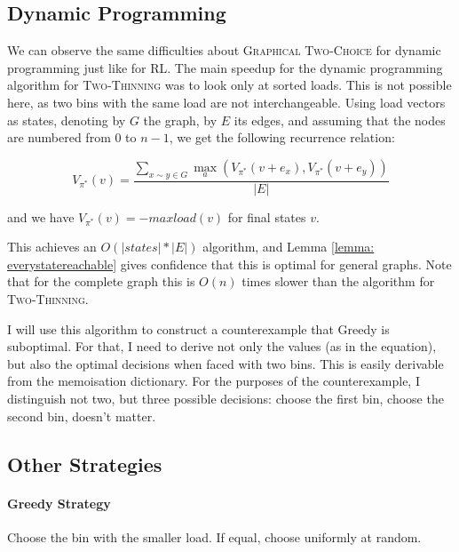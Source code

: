 \subsection{Dynamic Programming}


We can observe the same difficulties about \textsc{Graphical Two-Choice} for dynamic programming just like for RL. The main speedup for the dynamic programming algorithm for \textsc{Two-Thinning} was to look only at sorted loads. This is not possible here, as two bins with the same load are not interchangeable. Using load vectors as states, denoting by $G$ the graph, by $E$ its edges, and assuming that the nodes are numbered from $0$ to $n-1$, we get the following recurrence relation:


\begin{equation} \label{eq:graphicaltwochoice-dynamicprogramming}
    V_{\pi^*}(v) = \frac{\sum_{x\sim y \in G}\max_a (V_{\pi^*}(v+e_x), V_{\pi^*}(v+e_y))}{|E|}
\end{equation}


and we have $V_{\pi^*}(v)=-maxload(v)$ for final states $v$.

This achieves an $O(|states|*|E|)$ algorithm, and Lemma \ref{lemma: everystatereachable} gives confidence that this is optimal for general graphs. Note that for the complete graph this is $O(n)$ times slower than the algorithm for \textsc{Two-Thinning}.

I will use this algorithm to construct a counterexample that Greedy is suboptimal. For that, I need to derive not only the values (as in the equation), but also the optimal decisions when faced with two bins. This is easily derivable from the memoisation dictionary. For the purposes of the counterexample, I distinguish not two, but three possible decisions: choose the first bin, choose the second bin, doesn't matter.


\subsection{Other Strategies} \label{graphical-otherstrategies}


\paragraph{Greedy Strategy} Choose the bin with the smaller load. If equal, choose uniformly at random.


